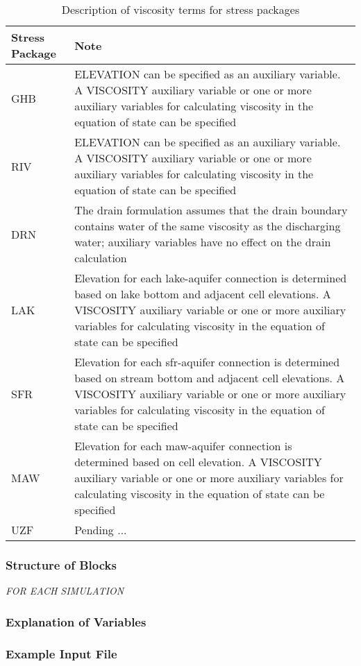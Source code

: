 \begin{longtable}{p{3cm} p{12cm}}
\caption{Description of viscosity terms for stress packages}
\tabularnewline
\hline
\hline
\textbf{Stress Package} & \textbf{Note} \\
\hline
\endhead
\hline
\endfoot
GHB & ELEVATION can be specified as an auxiliary variable.  A VISCOSITY auxiliary variable or one or more auxiliary variables for calculating viscosity in the equation of state can be specified \\
RIV & ELEVATION can be specified as an auxiliary variable.  A VISCOSITY auxiliary variable or one or more auxiliary variables for calculating viscosity in the equation of state can be specified \\
DRN & The drain formulation assumes that the drain boundary contains water of the same viscosity as the discharging water; auxiliary variables have no effect on the drain calculation  \\
LAK & Elevation for each lake-aquifer connection is determined based on lake bottom and adjacent cell elevations. A VISCOSITY auxiliary variable or one or more auxiliary variables for calculating viscosity in the equation of state can be specified \\
SFR & Elevation for each sfr-aquifer connection is determined based on stream bottom and adjacent cell elevations. A VISCOSITY auxiliary variable or one or more auxiliary variables for calculating viscosity in the equation of state can be specified \\
MAW & Elevation for each maw-aquifer connection is determined based on cell elevation. A VISCOSITY auxiliary variable or one or more auxiliary variables for calculating viscosity in the equation of state can be specified \\
UZF & Pending ... \\
\end{longtable}

\vspace{5mm}
\subsubsection{Structure of Blocks}

\vspace{5mm}
\noindent \textit{FOR EACH SIMULATION}




\vspace{5mm}
\subsubsection{Explanation of Variables}
\begin{description}

\end{description}

\vspace{5mm}
\subsubsection{Example Input File}

